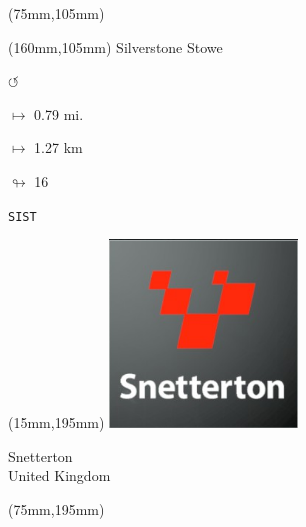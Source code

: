 \begin{textblock*}{80mm}(75mm,105mm)%
\end{textblock*}
\begin{textblock*}{40mm}(160mm,105mm)%
Silverstone Stowe
\par \Huge$\circlearrowleft$
\Large
\par$\mapsto$ 0.79 mi.
\par$\mapsto$ 1.27 km
\par$\looparrowright$ 16
\par\hfill\tiny\tt SIST\\
\end{textblock*}
\begin{textblock*}{50mm}(15mm,195mm)%
\includegraphics[width=50mm]{LG/2015-05-20_00095.png}
\par Snetterton\\ United Kingdom
\end{textblock*}
\begin{textblock*}{80mm}(75mm,195mm)%
\end{textblock*}
